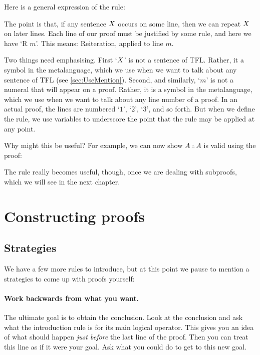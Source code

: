 Here is a general expression of the rule:
\begin{highlighted}
	\begin{fitchproof}
		\ellipsesline
		\ellipsesline
		 
	\end{fitchproof}
\end{highlighted}
The point is that, if any sentence $X$ occurs on some line, then we can repeat $X$ on later lines. Each line of our proof must be justified by some rule, and here we have `R $m$'. This means: Reiteration, applied to line $m$.

Two things need emphasising. First `$X$' is not a sentence of TFL. Rather, it a symbol in the metalanguage, which we use when we want to talk about any sentence of TFL (see \cref{sec:UseMention}). Second, and similarly, `$m$' is not a numeral that will appear on a proof. Rather, it is a symbol in the metalanguage, which we use when we want to talk about any line number of a proof. In an actual proof, the lines are numbered `$1$', `$2$', `$3$', and so forth. But when we define the rule, we use variables to underscore the point that the rule may be applied at any point.

Why might this be useful? For example, we can now show $A\,\therefore\,A$ is valid using the proof:
\begin{fitchproof}
	\hypo{a}{A}
	\Reiteration{a}
\end{fitchproof}
The rule really becomes useful, though, once we are dealing with subproofs, which we will see in the next chapter.




\section{Constructing proofs}




\subsection{Strategies}
We have a few more rules to introduce, but at this point we pause to mention a strategies to come up with proofs yourself:

\paragraph{Work backwards from what you want.}
The ultimate goal is to obtain the conclusion. Look at the conclusion and ask what the introduction rule is for its main logical operator. This gives you an idea of what should happen \emph{just before} the last line of the proof. Then you can treat this line as if it were your goal. Ask what you could do to get to this new goal.

